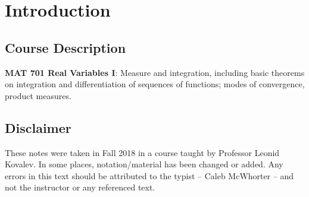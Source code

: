 \newpage
\section{Introduction}
\subsection{Course Description}

\textbf{MAT 701 Real Variables I}: Measure and integration, including basic theorems on integration and differentiation of sequences of functions; modes of convergence, product measures. 

\subsection{Disclaimer}

These notes were taken in Fall 2018 in a course taught by Professor Leonid Kovalev. In some places, notation/material has been changed or added. Any errors in this text should be attributed to the typist -- Caleb McWhorter -- and not the instructor or any referenced text. 